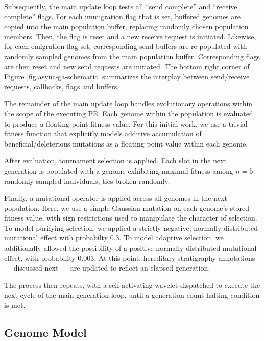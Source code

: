 Subsequently, the main update loop tests all ``send complete'' and ``receive complete'' flags.
For each immigration flag that is set, buffered genomes are copied into the main population buffer, replacing randomly chosen population members.
Then, the flag is reset and a new receive request is initiated.
Likewise, for each emigration flag set, corresponding send buffers are re-populated with randomly sampled genomes from the main population buffer.
Corresponding flags are then reset and new send requests are initiated.
The bottom right corner of Figure \ref{fig:async-ga-schematic} summarizes the interplay between send/receive requests, callbacks, flags and buffers.

The remainder of the main update loop handles evolutionary operations within the scope of the executing PE.
Each genome within the population is evaluated to produce a floating point fitness value.
For this initial work, we use a trivial fitness function that explicitly models additive accumulation of beneficial/deleterious mutations as a floating point value within each genome.

After evaluation, tournament selection is applied. %
Each slot in the next generation is populated with a genome exhibiting maximal fitness among $n=5$ randomly sampled individuals, ties broken randomly.

Finally, a mutational operator is applied across all genomes in the next population.
Here, we use a simple Gaussian mutation on each genome's stored fitness value, with sign restrictions used to manipulate the character of selection.
To model purifying selection, we applied a strictly negative, normally distributed mutational effect with probabilty 0.3.
To model adaptive selection, we additionally allowed the possibility of a positive normally distributed mutational effect, with probability 0.003.
At this point, hereditary stratigraphy annotations --- discussed next --- are updated to reflect an elapsed generation.

The process then repeats, with a self-activating wavelet dispatched to execute the next cycle of the main generation loop, until a generation count halting condition is met.

\subsection{Genome Model}

